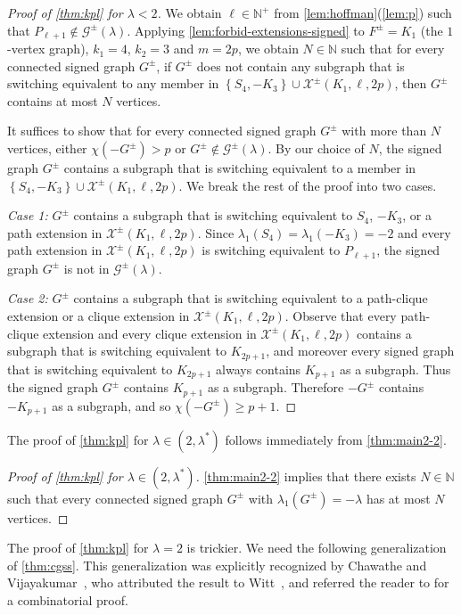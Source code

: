 \documentclass[11pt]{article}
\theoremstyle{definition}
\theoremstyle{remark}
\newcommand{\sset}[1]{\left\{{#1}\right\}}
\newcommand{\la}{\lambda}
\newcommand{\G}{\mathcal{G}}
\newcommand{\N}{\mathbb{N}}
\newcommand{\X}{\mathcal{X}}
\newcommand{\Gs}{\G^\pm(\la)}
\begin{document}
\begin{proof}[Proof of \cref{thm:kpl} for $\la < 2$]
    We obtain $\ell \in \N^+$ from \cref{lem:hoffman}(\ref{lem:p}) such that $P_{\ell+1} \not\in \Gs$. Applying \cref{lem:forbid-extensions-signed} to $F^\pm = K_1$ (the $1$-vertex graph), $k_1 = 4$, $k_2 = 3$ and $m = 2p$, we obtain $N \in \N$ such that for every connected signed graph $G^\pm$, if $G^\pm$ does not contain any subgraph that is switching equivalent to any member in $\sset{S_4, -K_3} \cup \X^\pm(K_1, \ell, 2p)$, then $G^\pm$ contains at most $N$ vertices.
    
    It suffices to show that for every connected signed graph $G^\pm$ with more than $N$ vertices, either $\chi(-G^\pm) > p$ or $G^\pm \not\in \Gs$. By our choice of $N$, the signed graph $G^\pm$ contains a subgraph that is switching equivalent to a member in $\sset{S_4, -K_3} \cup \X^\pm(K_1, \ell, 2p)$. We break the rest of the proof into two cases.
    
    \bigskip
    \noindent\textit{Case 1:} $G^\pm$ contains a subgraph that is switching equivalent to $S_4$, $-K_3$, or a path extension in $\X^\pm(K_1, \ell, 2p)$. Since $\la_1(S_4) = \la_1(-K_3) = -2$ and every path extension in $\X^\pm(K_1, \ell, 2p)$ is switching equivalent to $P_{\ell+1}$, the signed graph $G^\pm$ is not in $\Gs$.

    \bigskip
    \noindent\textit{Case 2:} $G^\pm$ contains a subgraph that is switching equivalent to a path-clique extension or a clique extension in $\X^\pm(K_1, \ell, 2p)$. Observe that every path-clique extension and every clique extension in $\X^\pm(K_1, \ell, 2p)$ contains a subgraph that is switching equivalent to $K_{2p+1}$, and moreover every signed graph that is switching equivalent to $K_{2p+1}$ always contains $K_{p+1}$ as a subgraph. Thus the signed graph $G^\pm$ contains $K_{p+1}$ as a subgraph. Therefore $-G^\pm$ contains $-K_{p+1}$ as a subgraph, and so $\chi(-G^\pm) \ge p+1$.
\end{proof}

The proof of \cref{thm:kpl} for $\la \in (2, \la^*)$ follows immediately from \cref{thm:main2-2}.

\begin{proof}[Proof of \cref{thm:kpl} for $\la \in (2, \la^*)$]
    \cref{thm:main2-2} implies that there exists $N\in\N$ such that every connected signed graph $G^\pm$ with $\la_1(G^\pm) = -\la$ has at most $N$ vertices.
\end{proof}

The proof of \cref{thm:kpl} for $\la = 2$ is trickier. We need the following generalization of \cref{thm:cgss}. This generalization was explicitly recognized by Chawathe and Vijayakumar~\cite[Theorem~1.1]{CV90}, who attributed the result to Witt~\cite{W41}, and referred the reader to \cite{CGSS76} for a combinatorial proof.
\end{document}
